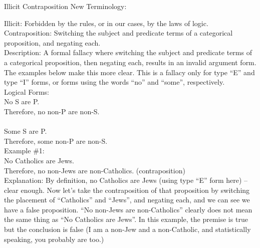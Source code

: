 \documentclass[a4paper,12pt,single,pdftex]{scrartcl}
\begin{document}
      
    
  

Illicit Contraposition
    New Terminology:

    
      Illicit: Forbidden by the rules, or in our cases, by the laws of logic.
    \\

    
      Contraposition: Switching the subject and predicate terms of a categorical proposition, and negating each.
    \\

    
      Description: A formal fallacy where switching the subject and predicate terms of a categorical proposition, then negating each, results in an invalid argument form.  The examples below make this more clear.  This is a fallacy only for type “E” and type “I” forms, or forms using the words “no” and “some”, respectively.
    \\

    
      Logical Forms:
    \\

    
      No S are P.
    \\

    
      Therefore, no non-P are non-S.
    \\

    
       
    \\

    
      Some S are P.
    \\

    
      Therefore, some non-P are non-S.
    \\

    
      Example \#1:
    \\

    
      No Catholics are Jews.
    \\

    
      Therefore, no non-Jews are non-Catholics. (contraposition)
    \\

    
      Explanation: By definition, no Catholics are Jews (using type “E” form here) -- clear enough.  Now let’s take the contraposition of that proposition by switching the placement of “Catholics” and “Jews”, and negating each, and we can see we have a false proposition.  “No non-Jews are non-Catholics” clearly does not mean the same thing as “No Catholics are Jews”.  In this example, the premise is true but the conclusion is false (I am a non-Jew and a non-Catholic, and statistically speaking, you probably are too.)
    \\
\end{document}
